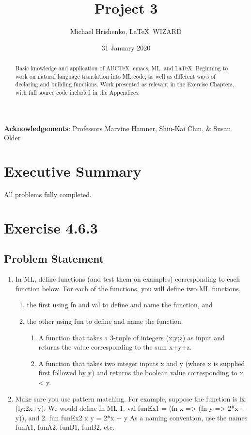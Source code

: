\documentclass[twoside]{report}
\title{Project 3}
\date{31 January 2020}
\author{Michael Hrishenko, \LaTeX\ WIZARD}
\begin{document}
\lstset{language=ML}
\maketitle
\begin{abstract}
    Basic knowledge and application of AUCTeX, emacs, ML, and \LaTeX{}. Beginning to work on natural language translation into ML code, as well as different ways of declaring and building functions. Work presented as relevant in the Exercise Chapters, with full source code included in the Appendices.
\end{abstract}

\textbf{Acknowledgements}: Professors Marvine Hamner, Shiu-Kai Chin, \& Susan Older

\tableofcontents

\chapter{Executive Summary}
\label{cha:executive-summary}
All problems fully completed.

\chapter{Exercise 4.6.3}
\label{cha:4-6-3}
\section{Problem Statement}
\begin{enumerate}
    \item In ML, define functions (and test them on examples) corresponding to each function below. For each of the functions, you will define two ML functions,
    \begin{enumerate}
        \item the first using fn and val to define and name the function, and
        \item the other using fun to define and name the function.
        \begin{enumerate}
            \item A function that takes a 3-tuple of integers (x;y;z) as input and returns the value corresponding to the sum x+y+z.
            \item A function that takes two integer inputs x and y (where x is supplied first followed by y) and returns the boolean value corresponding to x < y.
        \end{enumerate}
    \end{enumerate}
    \item Make sure you use pattern matching. For example, suppose the function is lx:(ly:2x+y). We would define in ML 1. val funEx1 = (fn x => (fn y => 2*x + y)), and 2. fun funEx2 x y = 2*x + y As a naming convention, use the names funA1, funA2, funB1, funB2, etc.
\end{enumerate}
\end{document}

